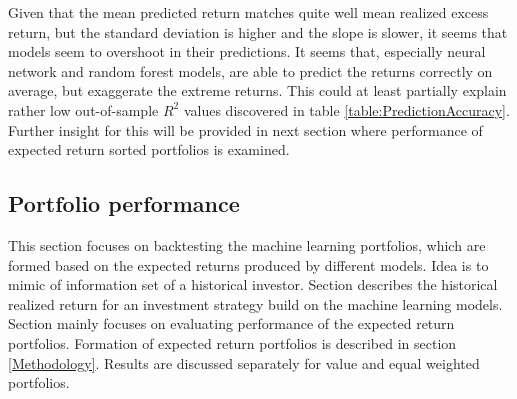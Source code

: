 \documentclass{article}
\begin{document}
Given that the mean predicted return matches quite well mean realized excess return, but the standard deviation is higher and the slope is slower, it seems that models seem to overshoot in their predictions. It seems that, especially neural network and random forest models, are able to predict the returns correctly on average, but exaggerate the extreme returns. This could at least partially explain rather low out-of-sample $R^2$ values discovered in table \ref{table:PredictionAccuracy}. Further insight for this will be provided in next section where performance of expected return sorted portfolios is examined. \par

\subsection{Portfolio performance}\label{Portfolio performance}

This section focuses on backtesting the machine learning portfolios, which are formed based on the expected returns produced by different models. Idea is to mimic of information set of a historical investor. Section describes the historical realized return for an investment strategy build on the machine learning models. Section mainly focuses on evaluating performance of the expected return portfolios. Formation of expected return portfolios is described in section \ref{Methodology}. Results are discussed separately for value and equal weighted portfolios. \par
\end{document}
